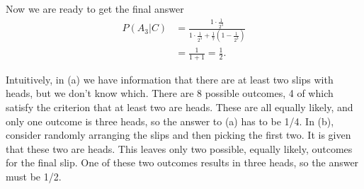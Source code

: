 \begin{exercise}[BH.2.21]
\begin{solution}
\begin{enumerate}
		Now we are ready to get the final answer
		\begin{align*}
			P(A_{3}|C)& =  \frac{1\cdot \frac{1}{2^3}}{1\cdot \frac{1}{2^3} + \frac{1}{7}(1-\frac{1}{2^3})}\\
			&=\frac{1}{1+1}=\frac{1}{2}.
		\end{align*}

		Intuitively, in (a) we have information that there are at least two slips with heads, but we don't know which. There are 8 possible outcomes, 4 of which satisfy the criterion that at least two are heads. These are all equally likely, and only one outcome is three heads, so the answer to (a) has to be 1/4. In (b), consider randomly arranging the slips and then picking the first two. It is given that these two are heads. This leaves only two possible, equally likely, outcomes for the final slip. One of these two outcomes results in three heads, so the answer must be 1/2.
	\end{enumerate}
\end{solution}
\end{exercise}

